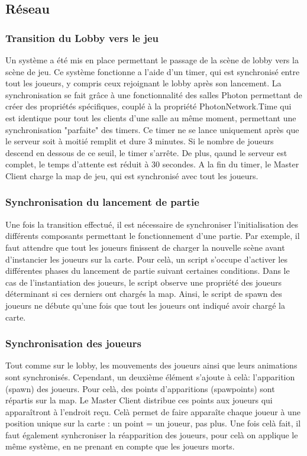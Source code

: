 \subsection{Réseau}

    \subsubsection{Transition du Lobby vers le jeu}
    
        Un système a été mis en place permettant le passage de la scène de lobby vers la scène de jeu.
        Ce système fonctionne a l'aide d'un timer, qui est synchronisé entre tout les joueurs, y compris ceux
        rejoignant le lobby après son lancement. La synchronisation se fait grâce à une fonctionnalité des salles Photon
        permettant de créer des propriétés spécifiques, couplé à la propriété PhotonNetwork.Time qui
        est identique pour tout les clients d'une salle au même moment, permettant une synchronisation
        "parfaite" des timers.
        Ce timer ne se lance uniquement après que le serveur soit à moitié remplit et dure 3 minutes. Si le nombre de joueurs descend en dessous de ce seuil, le timer s'arrête. De plus, qaund le serveur
        est complet, le temps d'attente est réduit à 30 secondes.
        A la fin du timer, le Master Client charge la map de jeu, qui est synchronisé avec tout les joueurs.


    \subsubsection{Synchronisation du lancement de partie}
        Une fois la transition effectué, il est nécessaire de synchroniser l'initialisation des différents composants
        permettant le fonctionnement d'une partie. Par exemple, il faut attendre que tout les joueurs finissent de charger
        la nouvelle scène avant d'instancier les joueurs sur la carte. Pour celà, un script s'occupe d'activer les différentes phases
        du lancement de partie suivant certaines conditions. Dans le cas de l'instantiation des joueurs, le script observe une propriété
        des joueurs déterminant si ces derniers ont chargés la map. Ainsi, le script de spawn des joueurs ne débute qu'une fois que tout les joueurs
        ont indiqué avoir chargé la carte.

    \subsubsection{Synchronisation des joueurs}
        Tout comme sur le lobby, les mouvements des joueurs ainsi que leurs animations sont synchronisés. Cependant,
        un deuxième élément s'ajoute à celà: l'apparition (spawn) des joueurs. Pour celà, des points d'apparitions (spawpoints)
        sont répartis sur la map. Le Master Client distribue ces points aux joueurs qui apparaîtront à l'endroit reçu. Celà permet
        de faire apparaîte chaque joueur à une position unique sur la carte : un point = un joueur, pas plus. Une fois celà fait,
        il faut également synhcroniser la réapparition des joueurs, pour celà on applique le même système, en ne prenant en compte que les joueurs
        morts.

